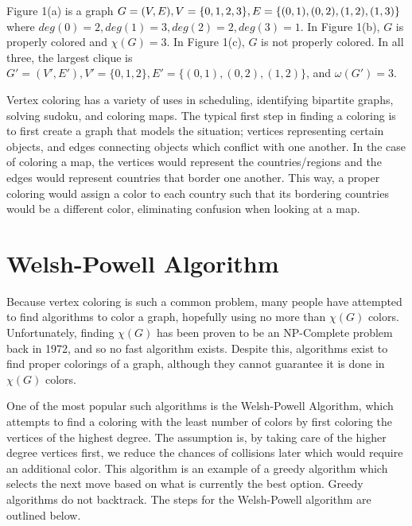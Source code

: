 \documentclass[12pt, letterpaper]{article}
\begin{document}
Figure 1(a) is a graph $G=(V,E), V=\{0,1,2,3\}, E=\{(0,1),(0,2),\\(1,2),(1,3)\}$ where $deg(0)=2,deg(1)=3,deg(2)=2,deg(3)=1$. In Figure 1(b), $G$ is properly colored and $\chi (G)=3$. In Figure 1(c), $G$ is not properly colored. In all three, the largest clique is $G'=(V',E'),V'=\{0,1,2\},E'=\{(0,1),(0,2),(1,2)\}$, and $\omega(G')=3$.


\begin{figure}%
    \centering
    \qquad
    \qquad
    \caption{}
\end{figure}
Vertex coloring has a variety of uses in scheduling, identifying bipartite graphs, solving sudoku, and coloring maps. The typical first step in finding a coloring is to first create a graph that models the situation; vertices representing certain objects, and edges connecting objects which conflict with one another. In the case of coloring a map, the vertices would represent the countries/regions and the edges would represent countries that border one another. This way, a proper coloring would assign a color to each country such that its bordering countries would be a different color, eliminating confusion when looking at a map. 
\section*{Welsh-Powell Algorithm}
Because vertex coloring is such a common problem, many people have attempted to find algorithms to color a graph, hopefully using no more than $\chi (G)$ colors. Unfortunately, finding $\chi(G)$ has been proven to be an NP-Complete problem back in 1972, and so no fast algorithm exists. Despite this, algorithms exist to find proper colorings of a graph, although they cannot guarantee it is done in $\chi(G)$ colors.


One of the most popular such algorithms is the Welsh-Powell Algorithm, which attempts to find a coloring with the least number of colors by first coloring the vertices of the highest degree. The assumption is, by taking care of the higher degree vertices first, we reduce the chances of collisions later which would require an additional color. This algorithm is an example of a greedy algorithm\cite{GeeksforGeeks} which selects the next move based on what is currently the best option. Greedy algorithms do not backtrack. The steps for the Welsh-Powell algorithm are outlined below.
\end{document}
